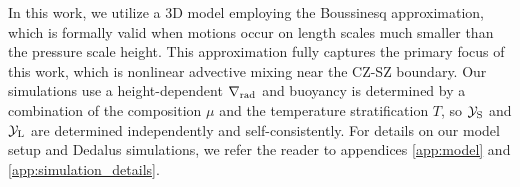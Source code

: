 In this work, we utilize a 3D model employing the Boussinesq approximation, which is formally valid when motions occur on length scales much smaller than the pressure scale height.
This approximation fully captures the primary focus of this work, which is nonlinear advective mixing near the CZ-SZ boundary.
Our simulations use a height-dependent $\nabla_{\rm{rad}}$ and buoyancy is determined by a combination of the composition $\mu$ and the temperature stratification $T$, so $\mathcal{Y}_{\rm{S}}$ and $\mathcal{Y}_{\rm{L}}$ are determined independently and self-consistently.
For details on our model setup and Dedalus simulations, we refer the reader to appendices \ref{app:model} and \ref{app:simulation_details}.
